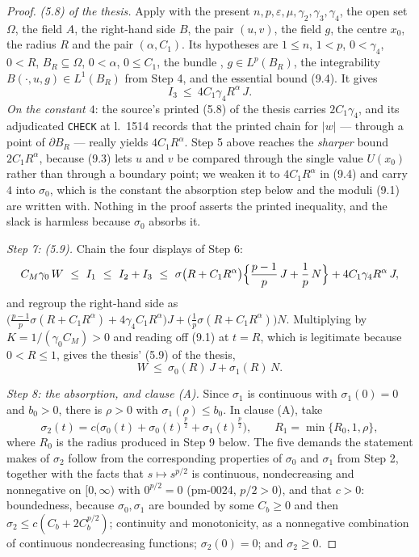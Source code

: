 \begin{proof}
\emph{(5.8) of the thesis.}  Apply  with the
present $n,p,\varepsilon,\mu,\gamma_2,\gamma_3,\gamma_4$, the open set
$\Omega$, the field $A$, the right-hand side $B$, the pair $(u,v)$, the field
$g$, the centre $x_0$, the radius $R$ and the pair $(\alpha,C_1)$.  Its
hypotheses are $1\le n$, $1<p$, $0<\gamma_4$, $0<R$, $B_R\subseteq\Omega$,
$0<\alpha$, $0\le C_1$, the bundle ,
$g\in L^p(B_R)$, the integrability $B(\cdot,u,g)\in L^1(B_R)$ from Step 4, and
the essential bound (9.4).  It gives
\[
I_3\ \le\ 4C_1\gamma_4R^{\alpha}\,J .
\]
\emph{On the constant $4$}: the source's printed (5.8) of the thesis carries
$2C_1\gamma_4$, and its adjudicated \texttt{CHECK} at l.~1514 records that the
printed chain for $|w|$ --- through a point of $\partial B_R$ --- really yields
$4C_1R^{\alpha}$.  Step 5 above reaches the \emph{sharper} bound
$2C_1R^{\alpha}$, because (9.3) lets $u$ and $v$ be compared through the single
value $U(x_0)$ rather than through a boundary point; we weaken it to
$4C_1R^{\alpha}$ in (9.4) and carry $4$ into $\sigma_0$, which is the constant
the absorption step below and the moduli (9.1) are written with.  Nothing in the
proof asserts the printed inequality, and the slack is harmless because
$\sigma_0$ absorbs it.

\medskip
\noindent\emph{Step 7: \textup{(5.9)}.}  Chain the four displays of Step 6:
\[
C_M\gamma_0\,W\ \le\ I_1\ \le\ I_2+I_3\ \le\
\sigma\bigl(R+C_1R^{\alpha}\bigr)\Bigl\{\frac{p-1}p\,J+\frac1p\,N\Bigr\}
+4C_1\gamma_4R^{\alpha}\,J ,
\]
and regroup the right-hand side as
$\bigl(\frac{p-1}p\sigma(R+C_1R^{\alpha})+4\gamma_4C_1R^{\alpha}\bigr)J
+\bigl(\frac1p\sigma(R+C_1R^{\alpha})\bigr)N$.  Multiplying by
$K=1/(\gamma_0C_M)>0$ and reading off (9.1) at $t=R$, which is legitimate
because $0<R\le1$, gives the thesis' (5.9) of the thesis,
\[
W\ \le\ \sigma_0(R)\,J+\sigma_1(R)\,N .
\tag{9.5}
\]

\medskip
\noindent\emph{Step 8: the absorption, and clause \textup{(A)}.}  Since
$\sigma_1$ is continuous with $\sigma_1(0)=0$ and $b_0>0$, there is $\rho>0$
with $\sigma_1(\rho)\le b_0$.  In clause (A), take
\[
\sigma_2(t)=c\bigl(\sigma_0(t)+\sigma_0(t)^{\frac p2}+\sigma_1(t)^{\frac p2}\bigr),
\qquad
R_1=\min\{R_0,1,\rho\},
\]
where $R_0$ is the radius produced in Step 9 below.  The five demands the
statement makes of $\sigma_2$ follow from the corresponding properties of
$\sigma_0$ and $\sigma_1$ from Step 2, together with the facts that
$s\mapsto s^{p/2}$ is continuous, nondecreasing and nonnegative on $[0,\infty)$
with $0^{p/2}=0$ (pm-0024, $p/2>0$), and that $c>0$: boundedness, because
$\sigma_0,\sigma_1$ are bounded by some $C_b\ge0$ and then
$\sigma_2\le c(C_b+2C_b^{p/2})$; continuity and monotonicity, as a nonnegative
combination of continuous nondecreasing functions; $\sigma_2(0)=0$; and
$\sigma_2\ge0$.


\end{proof}
